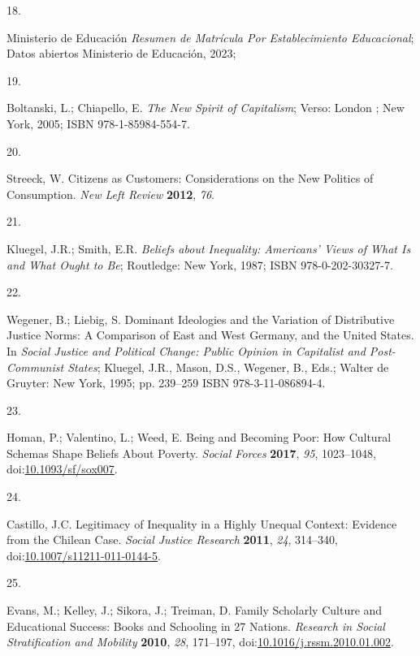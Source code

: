 \documentclass[
  12pt,
  letterpaper,
]{article}
\newlength{\cslhangindent}
\newlength{\csllabelwidth}
\newenvironment{CSLReferences}[2] %
 {\begin{list}{}{%
  \setlength{\itemindent}{0pt}
  \setlength{\leftmargin}{0pt}
  \setlength{\parsep}{0pt}
  \ifodd #1
   \setlength{\leftmargin}{\cslhangindent}
   \setlength{\itemindent}{-1\cslhangindent}
  \fi
  \setlength{\itemsep}{#2\baselineskip}}}
 {\end{list}}
\newcommand{\CSLLeftMargin}[1]{\parbox[t]{\csllabelwidth}{\strut#1\strut}}
\newcommand{\CSLRightInline}[1]{\parbox[t]{\linewidth - \csllabelwidth}{\strut#1\strut}}
\begin{document}
\begin{CSLReferences}{0}{0}
\CSLLeftMargin{18. }%
\CSLRightInline{Ministerio de Educación \emph{Resumen de Matr{í}cula Por
Establecimiento Educacional}; Datos abiertos Ministerio de Educaci{ó}n,
2023;}

\CSLLeftMargin{19. }%
\CSLRightInline{Boltanski, L.; Chiapello, E. \emph{The New Spirit of
Capitalism}; Verso: London ; New York, 2005; ISBN 978-1-85984-554-7.}

\CSLLeftMargin{20. }%
\CSLRightInline{Streeck, W. Citizens as {Customers}: {Considerations} on
the {New Politics} of {Consumption}. \emph{New Left Review}
\textbf{2012}, \emph{76}.}

\CSLLeftMargin{21. }%
\CSLRightInline{Kluegel, J.R.; Smith, E.R. \emph{Beliefs about
{Inequality}: {Americans}' {Views} of {What} Is and {What Ought} to Be};
Routledge: New York, 1987; ISBN 978-0-202-30327-7.}

\CSLLeftMargin{22. }%
\CSLRightInline{Wegener, B.; Liebig, S. Dominant {Ideologies} and the
{Variation} of {Distributive Justice Norms}: {A Comparison} of {East}
and {West Germany}, and the {United States}. In \emph{Social {Justice}
and {Political Change}: {Public Opinion} in {Capitalist} and
{Post-Communist States}}; Kluegel, J.R., Mason, D.S., Wegener, B., Eds.;
Walter de Gruyter: New York, 1995; pp. 239--259 ISBN 978-3-11-086894-4.}

\CSLLeftMargin{23. }%
\CSLRightInline{Homan, P.; Valentino, L.; Weed, E. Being and {Becoming
Poor}: {How Cultural Schemas Shape Beliefs About Poverty}. \emph{Social
Forces} \textbf{2017}, \emph{95}, 1023--1048,
doi:\href{https://doi.org/10.1093/sf/sox007}{10.1093/sf/sox007}.}

\CSLLeftMargin{24. }%
\CSLRightInline{Castillo, J.C. Legitimacy of {Inequality} in a {Highly
Unequal Context}: {Evidence} from the {Chilean Case}. \emph{Social
Justice Research} \textbf{2011}, \emph{24}, 314--340,
doi:\href{https://doi.org/10.1007/s11211-011-0144-5}{10.1007/s11211-011-0144-5}.}

\CSLLeftMargin{25. }%
\CSLRightInline{Evans, M.; Kelley, J.; Sikora, J.; Treiman, D. Family
Scholarly Culture and Educational Success: {Books} and Schooling in 27
Nations. \emph{Research in Social Stratification and Mobility}
\textbf{2010}, \emph{28}, 171--197,
doi:\href{https://doi.org/10.1016/j.rssm.2010.01.002}{10.1016/j.rssm.2010.01.002}.}


\end{CSLReferences}
\end{document}
